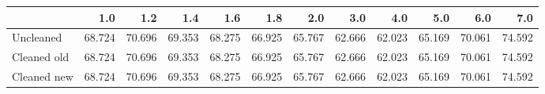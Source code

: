\begin{tabular}{lrrrrrrrrrrr}
\toprule
{} &    1.0 &    1.2 &    1.4 &    1.6 &    1.8 &    2.0 &    3.0 &    4.0 &    5.0 &    6.0 &    7.0 \\
\midrule
Uncleaned   & 68.724 & 70.696 & 69.353 & 68.275 & 66.925 & 65.767 & 62.666 & 62.023 & 65.169 & 70.061 & 74.592 \\
Cleaned old & 68.724 & 70.696 & 69.353 & 68.275 & 66.925 & 65.767 & 62.666 & 62.023 & 65.169 & 70.061 & 74.592 \\
Cleaned new & 68.724 & 70.696 & 69.353 & 68.275 & 66.925 & 65.767 & 62.666 & 62.023 & 65.169 & 70.061 & 74.592 \\
\bottomrule
\end{tabular}
